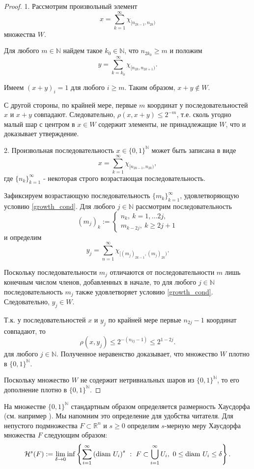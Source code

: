\documentclass[12pt]{article}
\def\N{{\mathbb{N}}}
\begin{document}
\begin{proof}
1. Рассмотрим произвольный элемент
$$x=\sum_{k=1}^\infty \chi_{[n_{2k-1},n_{2k})}$$
множества $W$.

Для любого $m\in \N$ найдем такое $k_0\in\N$, что $n_{2k_0}\ge m$ и положим
$$y=\sum_{k=k_0}^\infty \chi_{[n_{2k},n_{2k+1})}.$$

Имеем $(x+y)_i=1$ для любого $i\ge m$. Таким образом, $x+y\notin W$.

С другой стороны, по крайней мере, первые $m$ координат у последовательностей $x$ и $x+y$ совпадают. Следовательно, $\rho(x,x+y)\le2^{-m}$, т.е. сколь угодно малый шар с центром в $x\in W$ содержит элементы, не принадлежащие $W$, что и доказывает утверждение.

2. Произвольная последовательность $x\in\{0,1\}^\N$ может быть записана в виде
$$x=\sum_{k=1}^\infty \chi_{[n_{2k-1},n_{2k})},$$
где $\{n_k\}_{k=1}^\infty$ - некоторая строго возрастающая последовательность.

Зафиксируем возрастающую последовательность $\{m_k\}_{k=1}^\infty$, удовлетворяющую условию \eqref{growth_cond}. Для любого $j\in \N$ рассмотрим последовательность
$$(m_j)_k:=
\begin{cases}
n_k, \ k=1,\dots 2j,\\
m_{k-2j}, \ k\ge 2j+1
\end{cases}$$
и определим
$$y_j=\sum_{n=1}^\infty \chi_{[(m_j)_{2k-1},(m_j)_{2k})}.$$

Поскольку последовательности $m_j$ отличаются от последовательности $m$ лишь конечным числом членов, добавленных в начале, то для любого $j\in \N$ последовательность $m_j$ также удовлетворяет условию \eqref{growth_cond}. Следовательно, $y_j\in W$.

Т.к. у последовательностей $x$ и $y_j$ по крайней мере первые $n_{2j}-1$ координат совпадают, то
$$\rho(x,y_j)\le2^{-(n_{2j}-1)}\le2^{1-2j}.$$
для любого $j\in \N$. Полученное неравенство доказывает, что множество $W$ плотно в $\{0,1\}^\N$.


Поскольку множество $W$ не содержит нетривиальных шаров из $\{0,1\}^\N$, то его дополнение плотно в $\{0,1\}^\N$.
\end{proof}

На множестве $\{0,1\}^\N$ стандартным образом определяется размерность Хаусдорфа (см. например \cite[Секция 6]{Edgar}). Мы напомним это определение для удобства читателя. Для непустого подмножества $F\subset \mathbb R^n$ и $s\ge 0$ определим $s$-мерную меру Хаусдорфа множества $F$ следующим образом:
$$\mathcal H^s(F) := \lim_{\delta\to0} \inf \left\{\sum_{i=1}^\infty \left({\rm diam} \ U_i \right)^s \ : \ F\subset \bigcup_{i=1}^\infty  U_i, \  0\le {\rm diam} \ U_i \le \delta \right\}.$$
\end{document}
